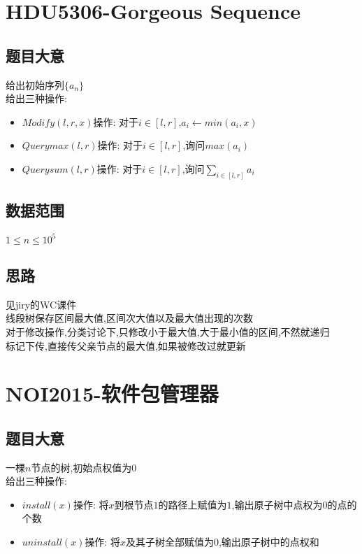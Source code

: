 \documentclass{ctexart}
\numberwithin{equation}{section}
\begin{document}
\begin{flushleft}
  \section{HDU5306-Gorgeous Sequence}
  \subsection{题目大意}
  给出初始序列$\{a_n\}$\\
  给出三种操作:\\
  \begin{itemize}
  \item $Modify(l,r,x)$操作: 对于$i\in [l,r]$,$a_i\leftarrow min(a_i,x)$
  \item $Querymax(l,r)$操作: 对于$i\in [l,r]$,询问$max(a_i)$
  \item $Querysum(l,r)$操作: 对于$i\in [l,r]$,询问$\sum_{i\in [l,r]}a_i$
  \end{itemize}
  \subsection{数据范围}
  $1\le n\le10^5$\\
  \subsection{思路}
  见jiry的WC课件\\
  线段树保存区间最大值,区间次大值以及最大值出现的次数\\
  对于修改操作,分类讨论下,只修改小于最大值,大于最小值的区间,不然就递归\\
  标记下传,直接传父亲节点的最大值,如果被修改过就更新\\ 
  \newpage

  \section{NOI2015-软件包管理器}
  \subsection{题目大意}
  一棵$n$节点的树,初始点权值为$0$\\
  给出三种操作:\\
  \begin{itemize}
  \item $install(x)$操作: 将$x$到根节点$1$的路径上赋值为$1$,输出原子树中点权为$0$的点的个数
  \item $uninstall(x)$操作: 将$x$及其子树全部赋值为$0$,输出原子树中的点权和
  \end{itemize}

\end{flushleft}
\end{document}
